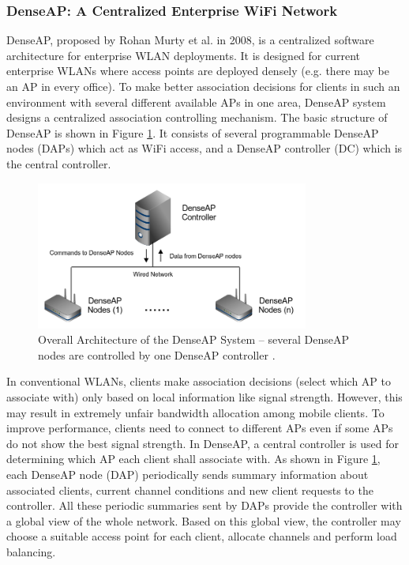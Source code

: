 \documentclass[english]{tktltiki}
\begin{document}
\subsubsection{DenseAP: A Centralized Enterprise WiFi Network}

DenseAP, proposed by Rohan Murty et al. \cite{mpc+08} in 2008, is a centralized software architecture for enterprise WLAN deployments. It is designed for current enterprise WLANs where access points are deployed densely (e.g. there may be an AP in every office). To make better association decisions for clients in such an environment with several different available APs in one area, DenseAP system designs a centralized association controlling mechanism. The basic structure of DenseAP is shown in Figure \ref{fig:denseap}. It consists of several programmable  DenseAP nodes (DAPs) which act as WiFi access, and a DenseAP controller (DC) which is the central controller.

\begin{figure}[htbp]
  \centering
  \includegraphics[width=0.8\textwidth]{images/denseap.png}
  \caption{Overall Architecture of the DenseAP System -- several DenseAP nodes are controlled by one DenseAP controller  \cite{mpc+08}.}
  \label{fig:denseap}
\end{figure}

In conventional WLANs, clients make association decisions (select which AP to associate with) only based on local information like signal strength. However, this may result in extremely unfair bandwidth allocation among mobile clients. To improve performance, clients need to connect to different APs even if some APs do not show the best signal strength. In DenseAP, a central controller is used for determining which AP each client shall associate with. As shown in Figure \ref{fig:denseap}, each DenseAP node (DAP) periodically sends summary information about associated clients, current channel conditions and new client requests to the controller. All these periodic summaries sent by DAPs provide the controller with a global view of the whole network. Based on this global view, the controller may choose a suitable access point for each client, allocate channels and perform load balancing.
\end{document}
